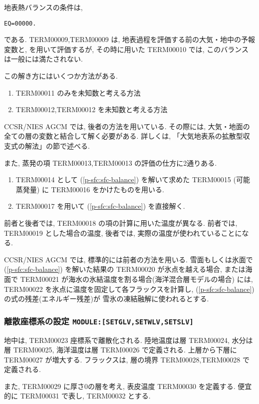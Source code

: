 地表熱バランスの条件は,
%
\begin{verbatim}
EQ=00000.
\end{verbatim}
%
である.
TERM00009,TERM00009 は,
地表過程を評価する前の大気・地中の予報変数と,
を用いて評価するが, 
その時に用いた TERM00010 では, このバランスは一般には満たされない.

この解き方にはいくつか方法がある.
\begin{enumerate}
\item TERM00011 のみを未知数と考える方法
\item TERM00012,TERM00012 を未知数と考える方法
\end{enumerate}
CCSR/NIES AGCM では, 後者の方法を用いている.
その際には, 大気・地面の全ての層の変数と結合して解く必要がある.
詳しくは, 「大気地表系の拡散型収支式の解法」の節で述べる.

また, 蒸発の項 TERM00013,TERM00013 の評価の仕方に2通りある.
\begin{enumerate}
\item TERM00014 として
      (\ref{p-sfc:sfc-balance}) を解いて求めた TERM00015 
      (可能蒸発量) に  TERM00016 をかけたものを用いる.

\item TERM00017 を用いて
      (\ref{p-sfc:sfc-balance}) を直接解く.
\end{enumerate}
前者と後者では, TERM00018 の項の計算に用いた温度が異なる.
前者では, TERM00019 とした場合の温度,
後者では, 実際の温度が使われていることになる.

CCSR/NIES AGCM では, 標準的には前者の方法を用いる.
雪面もしくは氷面で (\ref{p-sfc:sfc-balance}) を解いた結果の
TERM00020 が氷点を越える場合, 
または海面で TERM00021 が海水の氷結温度を割る場合(海洋混合層モデルの場合)
には, TERM00022 を氷点に温度を固定して各フラックスを計算し,
(\ref{p-sfc:sfc-balance}) の式の残差(エネルギー残差)が
雪氷の凍結融解に使われるとする.

\subsubsection{離散座標系の設定 \texttt{MODULE:[SETGLV,SETWLV,SETSLV]}}

地中は, TERM00023 座標系で離散化される.
陸地温度は層 TERM00024, 水分は層 TERM00025, 
海洋温度は層 TERM00026 で定義される.
上層から下層に TERM00027 が増大する.
フラックスは, 層の境界 TERM00028,TERM00028 で定義される.

また, TERM00029 に厚さ0の層を考え,
表皮温度 TERM00030 を定義する.
便宜的に TERM00031 で表し, TERM00032 とする.

